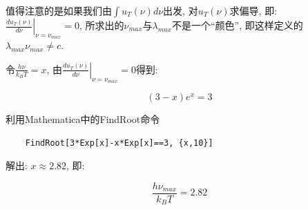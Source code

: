 \begin{enumerate}
值得注意的是如果我们由$\int u_T(\nu) d \nu$出发, 对$u_T(\nu)$求偏导,
即: $\left.{ \frac{d u_T(\nu)}{d \nu}} \right|_{\nu = \nu_{max}}=
0$, 所求出的$\nu_{max}$与$\lambda_{max}$不是一个``颜色'',
即这样定义的$\lambda_{max} \nu_{max} \neq c$.

令$\frac{h\nu}{k_BT}=x$, 由$\left.{ \frac{d u_T(\nu)}{d \nu}}
\right|_{\nu = \nu_{max}}= 0$得到:

\begin{equation*}
    (3-x)e^x = 3
\end{equation*}

利用Mathematica中的FindRoot命令

\begin{verbatim}
    FindRoot[3*Exp[x]-x*Exp[x]==3, {x,10}]
\end{verbatim}

解出: $x \approx 2.82 $, 即:


\begin{equation*}
\frac{h\nu_{max}}{k_BT} = 2.82
\end{equation*}




\end{enumerate}

